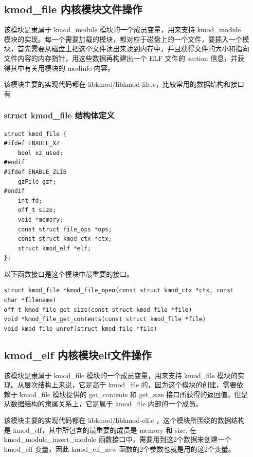 \subsection{kmod\_file 内核模块文件操作}

该模块是隶属于 kmod\_module 模块的一个成员变量，用来支持 kmod\_module
模块的实现。每一个需要加载的模块，都对应于磁盘上的一个文件，要插入一个模块，首先需要从磁盘上把这个文件读出来读到内存中，并且获得文件的大小和指向文件内容的内存指针，用这些数据再构建出一个
ELF 文件的 section 信息，并获得其中有关用模块的 modinfo 内容。

该模块主要的实现代码都在
libkmod/libkmod-file.c，比较常用的数据结构和接口有

\subsubsection{struct kmod\_file 结构体定义}

{\begin{shaded}\begin{verbatim}
struct kmod_file {
#ifdef ENABLE_XZ
    bool xz_used;
#endif
#ifdef ENABLE_ZLIB
    gzFile gzf;
#endif
    int fd; 
    off_t size;
    void *memory;
    const struct file_ops *ops;
    const struct kmod_ctx *ctx;
    struct kmod_elf *elf;
};
\end{verbatim}\end{shaded}}
以下函数接口是这个模块中最重要的接口。

{\begin{shaded}\begin{verbatim}
struct kmod_file *kmod_file_open(const struct kmod_ctx *ctx, const char *filename)  
off_t kmod_file_get_size(const struct kmod_file *file)
void *kmod_file_get_contents(const struct kmod_file *file)
void kmod_file_unref(struct kmod_file *file)
\end{verbatim}\end{shaded}}
\subsection{kmod\_elf 内核模块elf文件操作}

该模块是隶属于 kmod\_file 模块的一个成员变量，用来支持 kmod\_file
模块的实现。从层次结构上来说，它是高于 kmod\_file
的，因为这个模块的创建，需要依赖于 kmod\_file 模块提供的 get\_contents 和
get\_size 接口所获得的返回值。但是从数据结构的隶属关系上，它是属于
kmod\_file 内部的一个成员。

该模块主要的实现代码都在 libkmod/libkmod-elf.c
，这个模块所围绕的数据结构是 kmod\_elf，其中所包含的最重要的成员是 memory
和 size, 在 kmod\_module\_insert\_module
函数接口中，需要用到这2个数据来创建一个 kmod\_elf 变量，因此
kmod\_elf\_new 函数的2个参数也就是用的这2个变量。

